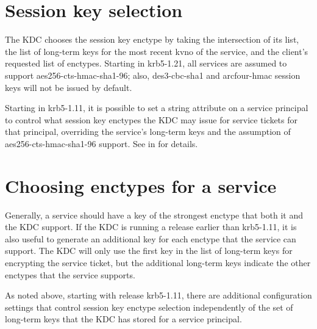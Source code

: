 \documentclass[letterpaper,10pt,english]{sphinxmanual}
\begin{document}
\section{Session key selection}
\label{\detokenize{admin/enctypes:session-key-selection}}\label{\detokenize{admin/enctypes:id1}}
The KDC chooses the session key enctype by taking the intersection of
its  list, the list of long-term keys for the
most recent kvno of the service, and the client’s requested list of
enctypes.  Starting in krb5-1.21, all services are assumed to support
aes256-cts-hmac-sha1-96; also, des3-cbc-sha1 and arcfour-hmac session
keys will not be issued by default.

Starting in krb5-1.11, it is possible to set a string attribute on a
service principal to control what session key enctypes the KDC may
issue for service tickets for that principal, overriding the service’s
long-term keys and the assumption of aes256-cts-hmac-sha1-96 support.
See {\hyperref[\detokenize{admin/admin_commands/kadmin_local:set-string}]{}} in {\hyperref[\detokenize{admin/admin_commands/kadmin_local:kadmin-1}]{}} for details.


\section{Choosing enctypes for a service}
\label{\detokenize{admin/enctypes:choosing-enctypes-for-a-service}}
Generally, a service should have a key of the strongest
enctype that both it and the KDC support.  If the KDC is running a
release earlier than krb5-1.11, it is also useful to generate an
additional key for each enctype that the service can support.  The KDC
will only use the first key in the list of long-term keys for encrypting
the service ticket, but the additional long-term keys indicate the
other enctypes that the service supports.

As noted above, starting with release krb5-1.11, there are additional
configuration settings that control session key enctype selection
independently of the set of long-term keys that the KDC has stored for
a service principal.
\end{document}
